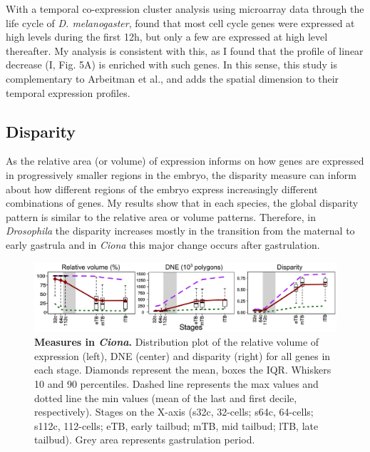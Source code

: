 With a temporal co-expression cluster analysis using microarray data through the life cycle of \textit{D. melanogaster}, \citet{Arbeitman2002} found that most cell cycle genes were expressed at high levels during the first 12h, but only a few are expressed at high level thereafter.
My analysis is consistent with this, as I found that the profile of linear decrease (I, Fig. 5A) is enriched with such genes. In this sense, this study is complementary to Arbeitman et al., and adds the spatial dimension to their temporal expression profiles.


\subsection{Disparity}
As the relative area (or volume) of expression informs on how genes are expressed in progressively smaller regions in the embryo, the disparity measure can inform about how different regions of the embryo express increasingly different combinations of genes.
%
My results show that in each species, the global disparity pattern is similar to the relative area or volume patterns.
Therefore, in \textit{Drosophila} the disparity increases mostly in the transition from the maternal to early gastrula and in \textit{Ciona} this major change occurs after gastrulation.

\begin{figure}[b]
  \includegraphics[width=\textwidth]{./Images/Art-II/3_measures_nostars.png}
  \centering
  \caption{\textbf{Measures in \textit{Ciona}.} Distribution plot of the relative volume of expression (left), DNE (center) and disparity (right) for all genes in each stage. Diamonds represent the mean, boxes the IQR. Whiskers 10 and 90 percentiles. Dashed line represents the max values and dotted line the min values (mean of the last and first decile, respectively). Stages on the X-axis (s32c, 32-cells; s64c, 64-cells; s112c, 112-cells; eTB, early tailbud; mTB, mid tailbud; lTB, late tailbud). Grey area represents gastrulation period.}
  \label{fig:Art-II-3measures}
\end{figure}

